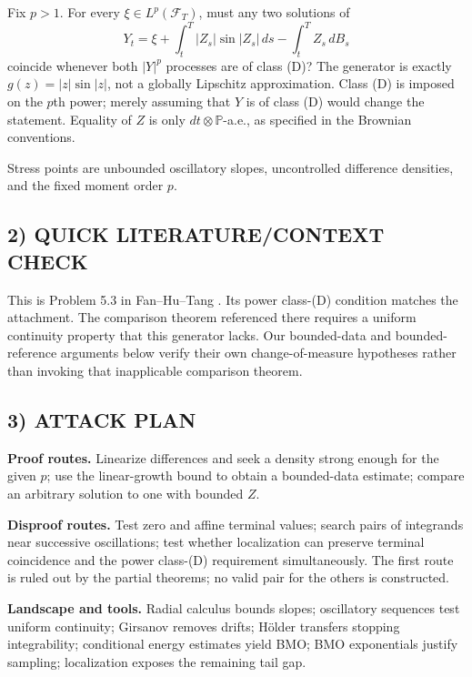 \documentclass[11pt,a4paper]{article}
\newcommand{\Pp}{\mathbb P}
\newcommand{\F}{\mathcal F}
\theoremstyle{definition}
\begin{document}
Fix $p>1$. For every $\xi\in L^p(\F_T)$, must any two solutions of
\[
 Y_t=\xi+\int_t^T|Z_s|\sin|Z_s|\,ds-\int_t^TZ_s\,dB_s
\]
coincide whenever both $|Y|^p$ processes are of class (D)? The generator is exactly $g(z)=|z|\sin|z|$, not a globally Lipschitz approximation. Class (D) is imposed on the $p$th power; merely assuming that $Y$ is of class (D) would change the statement. Equality of $Z$ is only $dt\otimes\Pp$-a.e., as specified in the Brownian conventions.

Stress points are unbounded oscillatory slopes, uncontrolled difference densities, and the fixed moment order $p$.

\subsection*{2) QUICK LITERATURE/CONTEXT CHECK}
This is Problem 5.3 in Fan--Hu--Tang \cite{FHT}. Its power class-(D) condition matches the attachment. The comparison theorem referenced there requires a uniform continuity property that this generator lacks. Our bounded-data and bounded-reference arguments below verify their own change-of-measure hypotheses rather than invoking that inapplicable comparison theorem.

\subsection*{3) ATTACK PLAN}
\textbf{Proof routes.} Linearize differences and seek a density strong enough for the given $p$; use the linear-growth bound to obtain a bounded-data estimate; compare an arbitrary solution to one with bounded $Z$.

\textbf{Disproof routes.} Test zero and affine terminal values; search pairs of integrands near successive oscillations; test whether localization can preserve terminal coincidence and the power class-(D) requirement simultaneously. The first route is ruled out by the partial theorems; no valid pair for the others is constructed.

\textbf{Landscape and tools.} Radial calculus bounds slopes; oscillatory sequences test uniform continuity; Girsanov removes drifts; H\"older transfers stopping integrability; conditional energy estimates yield BMO; BMO exponentials justify sampling; localization exposes the remaining tail gap.
\end{document}
